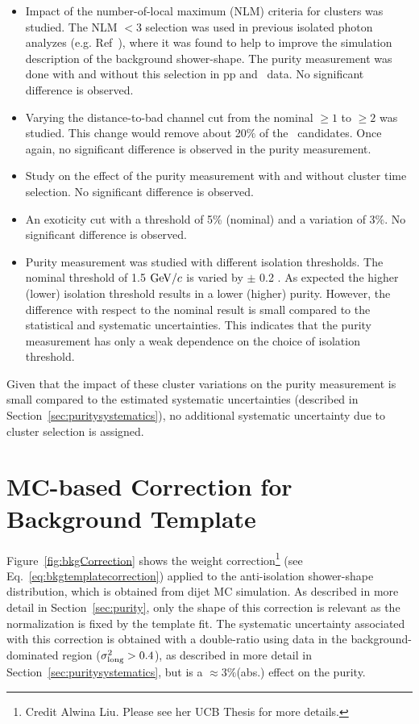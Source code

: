   \begin{itemize}
    \item Impact of the number-of-local maximum (NLM) criteria for clusters was studied. The NLM $<3$ selection was used in previous isolated photon analyzes (e.g. Ref~\cite{Acharya:2019jkx,Erwann}), where it was found to help to improve the simulation description of the background shower-shape. The purity measurement was done with and without this selection in pp and \pPb~data. No significant difference is observed.

    \item Varying the distance-to-bad channel cut from the nominal $\geq 1$ to $\geq 2$ was studied. This change would remove about 20$\%$ of the \gammaiso~candidates. Once again, no significant difference is observed in the purity measurement. 

    \item Study on the effect of the purity measurement with and without cluster time selection. No significant difference is observed. 

    \item An exoticity cut with a threshold of 5\% (nominal) and a variation of $3\%$. No significant difference is observed. 

    \item Purity measurement was studied with different isolation thresholds. The nominal threshold of 1.5 $\mathrm{GeV}/c$ is varied by $\pm$ 0.2 \GeVc. As expected the higher (lower) isolation threshold results in a lower (higher) purity. However, the difference with respect to the nominal result is small compared to the statistical and systematic uncertainties. This indicates that the purity measurement has only a weak dependence on the choice of isolation threshold. 
  \end{itemize}

Given that the impact of these cluster variations on the purity measurement is small compared to the estimated systematic uncertainties (described in Section~\ref{sec:puritysystematics}), no additional systematic uncertainty due to cluster selection is assigned. 

\section{MC-based Correction for Background Template}
\label{sec:MCbasedcorrection}

Figure~\ref{fig:bkgCorrection} shows the weight correction\footnote{Credit Alwina Liu. Please see her UCB Thesis for more details.} (see Eq.~\ref{eq:bkgtemplatecorrection}) applied to the anti-isolation shower-shape distribution, which is obtained from dijet MC simulation. As described in more detail in Section~\ref{sec:purity}, only the shape of this correction is relevant as the normalization is fixed by the template fit. The systematic uncertainty associated with this correction is obtained with a double-ratio using data in the background-dominated region ($\sigma^{2}_{\mathrm{long}}>0.4$), as described in more detail in Section~\ref{sec:puritysystematics}, but is a $\approx3\%$(abs.) effect on the purity. 

